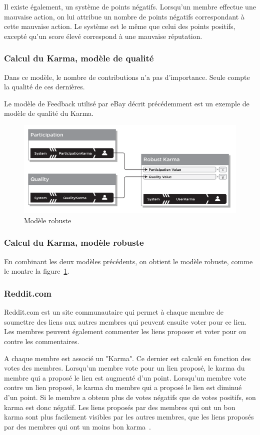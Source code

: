 \documentclass[a4paper, 11pt]{article} %
\begin{document}
Il existe également, un système de points négatifs. Lorsqu'un membre effectue une mauvaise action, on lui attribue un nombre de points négatifs correspondant à cette mauvaise action. Le système est le même que celui des points positifs, excepté qu'un score élevé correspond à une mauvaise réputation.

\subsubsection{Calcul du Karma, modèle de qualité}
Dans ce modèle, le nombre de contributions n'a pas d'importance. Seule compte la qualité de ces dernières. 

Le modèle de Feedback utilisé par eBay décrit précédemment est un exemple de modèle de qualité du Karma.

\begin{figure}
	\begin{center}
		\includegraphics[width=12cm]{karma.png} 
	\end{center}
	\caption{Modèle robuste~\cite{FarmerGlass2010}}
	\label{robusteKarma}
\end{figure}

\subsubsection{Calcul du Karma, modèle robuste}
En combinant les deux modèles précédents, on obtient le modèle robuste, comme le montre la figure~\ref{robusteKarma}. 

\subsubsection{Reddit.com}
Reddit.com est un site communautaire qui permet à chaque membre de soumettre des liens aux autres membres qui peuvent ensuite voter pour ce lien. Les membres peuvent également commenter les liens proposer et voter pour ou contre les commentaires.

A chaque membre est associé un "Karma". Ce dernier est calculé en fonction des votes des membres. Lorsqu'un membre vote pour un lien proposé, le karma du membre qui a proposé le lien est augmenté d'un point. Lorsqu'un membre vote contre un lien proposé, le karma du membre qui a proposé le lien est diminué d'un point. Si le membre a obtenu plus de votes négatifs que de votes positifs, son karma est donc négatif. Les liens proposés par des membres qui ont un bon karma sont plus facilement visibles par les autres membres, que les liens proposés par des membres qui ont un moins bon karma~\cite{RedditTroll}.
\end{document}

